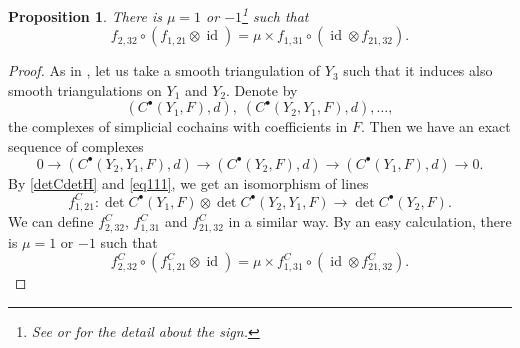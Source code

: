 \documentclass[11pt]{article}
\numberwithin{equation}{section}
\newcommand{\sbullet}{{\scriptscriptstyle\bullet}}
\theoremstyle{plain}
\newtheorem{prop}[lem]{Proposition}
\theoremstyle{definition}
\theoremstyle{remark}
\DeclareMathOperator{\id}{id}
\begin{document}
\begin{prop}\label{propFp}
There is $\mu=1$ or $-1$\footnote{See \cite[Rem.\,1.2]{BGS1} or
\cite{KM76} for the detail about the sign. } such that
\begin{equation}\label{mabu}
f_{2,32} \circ(f_{1,21}\otimes\id) = \mu \times
f_{1,31}\circ (\id \otimes f_{21,32}).
\end{equation}
\end{prop}
\begin{proof}
As in \cite[(0.15)]{BruningMa_2012}, let us take a smooth triangulation
of $Y_{3}$ such that it induces also smooth triangulations on
$Y_{1}$ and $Y_{2}$. Denote by
\[
(C^{\sbullet}(Y_{1},F),d),\;
(C^{\sbullet}(Y_{2},Y_{1},F),d), \ldots,
\]
the complexes of simplicial
cochains with coefficients in $F$. Then we have an exact sequence of
complexes
\begin{equation}\label{eq111}
0\to (C^{\sbullet}(Y_{2},Y_{1},F),d)\to (C^{\sbullet}(Y_{2},F),d)\to
(C^{\sbullet}(Y_{1},F),d)\to 0.
\end{equation}
By \eqref{detCdetH} and \eqref{eq111}, we get an isomorphism of lines
\begin{equation*}
f^{C}_{1,21}: \det C^{\sbullet}(Y_{1},F)\otimes \det
C^{\sbullet}(Y_{2},Y_{1},F)\to \det C^{\sbullet}(Y_{2},F).
\end{equation*}
We can define $f^{C}_{2,32}$, $f^{C}_{1,31}$ and $f^{C}_{21,32}$ in a
similar way. By an easy calculation, there is $\mu=1$ or $-1$ such that
\begin{equation}\label{mabuC}
f_{2,32}^{C} \circ(f_{1,21}^{C}\otimes\id) = \mu \times
f_{1,31}^{C}\circ (\id \otimes f_{21,32}^{C}).
\end{equation}


\end{proof}
\end{document}
